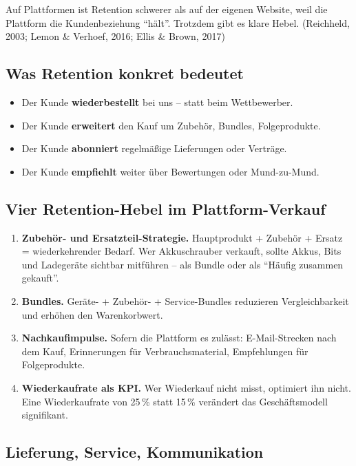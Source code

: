 \documentclass[11pt,a4paper,oneside]{article}
\newcommand{\fachbegriff}[1]{\textbf{#1}}
\newcommand{\quelle}[1]{{\footnotesize\color{lpGray}(#1)}}
\begin{document}
Auf Plattformen ist Retention schwerer als auf der eigenen Website, weil die Plattform die Kundenbeziehung ``hält''. Trotzdem gibt es klare Hebel. \quelle{Reichheld, 2003; Lemon \& Verhoef, 2016; Ellis \& Brown, 2017}

\subsection{Was Retention konkret bedeutet}

\begin{itemize}
  \item Der Kunde \textbf{wiederbestellt} bei uns -- statt beim Wettbewerber.
  \item Der Kunde \textbf{erweitert} den Kauf um Zubehör, Bundles, Folgeprodukte.
  \item Der Kunde \textbf{abonniert} regelmäßige Lieferungen oder Verträge.
  \item Der Kunde \textbf{empfiehlt} weiter über Bewertungen oder Mund-zu-Mund.
\end{itemize}

\subsection{Vier Retention-Hebel im Plattform-Verkauf}

\begin{enumerate}
  \item \fachbegriff{Zubehör- und Ersatzteil-Strategie.} Hauptprodukt + Zubehör + Ersatz = wiederkehrender Bedarf. Wer Akkuschrauber verkauft, sollte Akkus, Bits und Ladegeräte sichtbar mitführen -- als Bundle oder als ``Häufig zusammen gekauft''.
  \item \fachbegriff{Bundles.} Geräte- + Zubehör- + Service-Bundles reduzieren Vergleichbarkeit und erhöhen den Warenkorbwert.
  \item \fachbegriff{Nachkaufimpulse.} Sofern die Plattform es zulässt: E-Mail-Strecken nach dem Kauf, Erinnerungen für Verbrauchsmaterial, Empfehlungen für Folgeprodukte.
  \item \fachbegriff{Wiederkaufrate als KPI.} Wer Wiederkauf nicht misst, optimiert ihn nicht. Eine Wiederkaufrate von 25\,\% statt 15\,\% verändert das Geschäftsmodell signifikant.
\end{enumerate}

\subsection{Lieferung, Service, Kommunikation}
\end{document}
